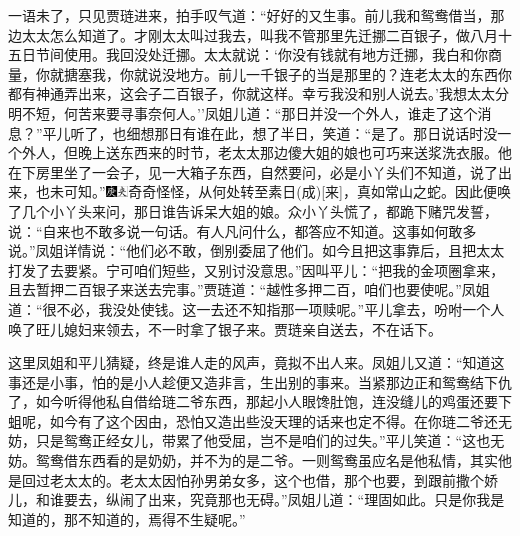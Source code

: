 一语未了，只见贾琏进来，拍手叹气道：``好好的又生事。前儿我和鸳鸯借当，那边太太怎么知道了。才刚太太叫过我去，叫我不管那里先迁挪二百银子，做八月十五日节间使用。我回没处迁挪。太太就说：`你没有钱就有地方迁挪，我白和你商量，你就搪塞我，你就说没地方。前儿一千银子的当是那里的？连老太太的东西你都有神通弄出来，这会子二百银子，你就这样。幸亏我没和别人说去。'我想太太分明不短，何苦来要寻事奈何人。''凤姐儿道：``那日并没一个外人，谁走了这个消息？''平儿听了，也细想那日有谁在此，想了半日，笑道：``是了。那日说话时没一个外人，但晚上送东西来的时节，老太太那边傻大姐的娘也可巧来送浆洗衣服。他在下房里坐了一会子，见一大箱子东西，自然要问，必是小丫头们不知道，说了出来，也未可知。''{\includegraphics[width=3mm]{../Images/00004}\includegraphics[width=3mm]{../Images/00012}\footnotesize \kaishu 奇奇怪怪，从何处转至素日{(成)}{[}来{]}，真如常山之蛇。}因此便唤了几个小丫头来问，那日谁告诉呆大姐的娘。众小丫头慌了，都跪下赌咒发誓，说：``自来也不敢多说一句话。有人凡问什么，都答应不知道。这事如何敢多说。''凤姐详情说：``他们必不敢，倒别委屈了他们。如今且把这事靠后，且把太太打发了去要紧。宁可咱们短些，又别讨没意思。''因叫平儿：``把我的金项圈拿来，且去暂押二百银子来送去完事。''贾琏道：``越性多押二百，咱们也要使呢。''凤姐道：``很不必，我没处使钱。这一去还不知指那一项赎呢。''平儿拿去，吩咐一个人唤了旺儿媳妇来领去，不一时拿了银子来。贾琏亲自送去，不在话下。

这里凤姐和平儿猜疑，终是谁人走的风声，竟拟不出人来。凤姐儿又道：``知道这事还是小事，怕的是小人趁便又造非言，生出别的事来。当紧那边正和鸳鸯结下仇了，如今听得他私自借给琏二爷东西，那起小人眼馋肚饱，连没缝儿的鸡蛋还要下蛆呢，如今有了这个因由，恐怕又造出些没天理的话来也定不得。在你琏二爷还无妨，只是鸳鸯正经女儿，带累了他受屈，岂不是咱们的过失。''平儿笑道：``这也无妨。鸳鸯借东西看的是奶奶，并不为的是二爷。一则鸳鸯虽应名是他私情，其实他是回过老太太的。老太太因怕孙男弟女多，这个也借，那个也要，到跟前撒个娇儿，和谁要去，纵闹了出来，究竟那也无碍。''凤姐儿道：``理固如此。只是你我是知道的，那不知道的，焉得不生疑呢。''

